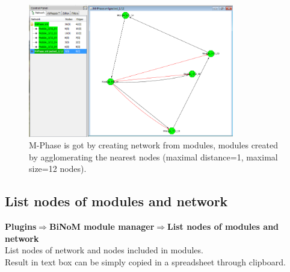 \begin{figure}
\centering
\includegraphics[width=0.8\textwidth]{graphics/M-Phase_packed}
\caption{M-Phase is got by creating network from modules, modules created by agglomerating the nearest nodes (maximal distance=1, maximal size=12 nodes).}
\label{M-Phase_packed}
\end{figure}

\subsection{List nodes of modules and network}
\textbf{Plugins$\Rightarrow$BiNoM module manager$\Rightarrow$List nodes of modules and network}\\
List nodes of network and nodes included in modules.\\
Result in text box can be simply copied in a spreadsheet through clipboard.

